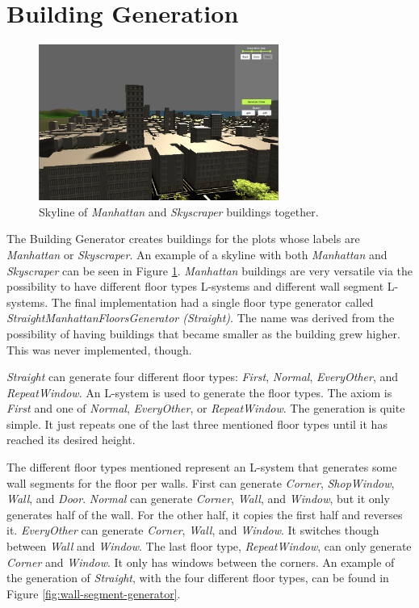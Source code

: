 \section{Building Generation}

\begin{figure}[H]
  \centering

  \includegraphics[width=0.7\textwidth]{figure/skyline.PNG}
  \caption{Skyline of \textit{Manhattan} and \textit{Skyscraper} buildings together.}

  \label{fig:skyline-result}
\end{figure}


The Building Generator creates buildings for the plots whose labels are \textit{Manhattan} or \textit{Skyscraper}. 
An example of a skyline with both \textit{Manhattan} and \textit{Skyscraper} can be seen in Figure \ref{fig:skyline-result}.
\textit{Manhattan} buildings are very versatile via the possibility to have different floor types L-systems and different wall segment L-systems. 
The final implementation had a single floor type generator called \textit{StraightManhattanFloorsGenerator (Straight)}. 
The name was derived from the possibility of having buildings that became smaller as the building grew higher. 
This was never implemented, though. 

\textit{Straight} can generate four different floor types: \textit{First}, \textit{Normal}, \textit{EveryOther}, and \textit{RepeatWindow}. 
An L-system is used to generate the floor types. The axiom is \textit{First} and one of \textit{Normal}, \textit{EveryOther}, or \textit{RepeatWindow}. 
The generation is quite simple. It just repeats one of the last three mentioned floor types until it has reached its desired height. 

The different floor types mentioned represent an L-system that generates some wall segments for the floor per walls. 
First can generate \textit{Corner}, \textit{ShopWindow}, \textit{Wall}, and \textit{Door}. \textit{Normal} can generate \textit{Corner}, \textit{Wall}, and \textit{Window}, but it only generates half of the wall. 
For the other half, it copies the first half and reverses it. \textit{EveryOther} can generate \textit{Corner}, \textit{Wall}, and \textit{Window}. 
It switches though between \textit{Wall} and \textit{Window}. The last floor type, \textit{RepeatWindow}, can only generate \textit{Corner} and \textit{Window}. 
It only has windows between the corners. An example of the generation of \textit{Straight}, with the four different floor types, can be found in Figure \ref{fig:wall-segment-generator}.


